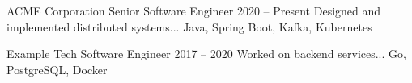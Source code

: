 
\ExperienceEntry
    {ACME Corporation}
    {Senior Software Engineer}
    {2020 -- Present}
    {Designed and implemented distributed systems...}
    {Java, Spring Boot, Kafka, Kubernetes}

\ExperienceEntry
    {Example Tech}
    {Software Engineer}
    {2017 -- 2020}
    {Worked on backend services...}
    {Go, PostgreSQL, Docker}